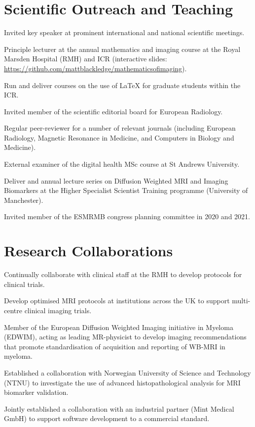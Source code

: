 \documentclass[]{mbcv}
\begin{document}
\section{Scientific Outreach and Teaching}
\vspace*{10pt}
\begin{tightemize}
\item Invited key speaker at prominent international and national scientific meetings.
\item Principle lecturer at the annual mathematics and imaging course at the Royal Marsden Hospital (RMH) and ICR (interactive slides: \href{https://github.com/mattblackledge/mathematicsofimaging}{https://github.com/mattblackledge/mathematicsofimaging}).
\item Run and deliver courses on the use of LaTeX for graduate students within the ICR. 
\item Invited member of the scientific editorial board for European Radiology.
\item Regular peer-reviewer for a number of relevant journals (including European Radiology, Magnetic Resonance in Medicine, and Computers in Biology and Medicine).
\item External examiner of the digital health MSc course at St Andrews University.
\item Deliver and annual lecture series on Diffusion Weighted MRI and Imaging Biomarkers at the Higher Specialist Scientist Training programme (University of Manchester).
\item Invited member of the ESMRMB congress planning committee in 2020 and 2021.
\end{tightemize}
\sectionsep


\section{Research Collaborations}
\vspace*{10pt}
\begin{tightemize}
\item Continually collaborate with clinical staff at the RMH to develop protocols for clinical trials.
\item Develop optimised MRI protocols at institutions across the UK to support multi-centre clinical imaging trials.
\item Member of the European Diffusion Weighted Imaging initiative in Myeloma (EDWIM), acting as leading MR-physicist to develop imaging recommendations that promote standardisation of acquisition and reporting of WB-MRI in myeloma.
\item Established a collaboration with Norwegian University of Science and Technology (NTNU) to investigate the use of advanced histopathological analysis for MRI biomarker validation.
\item Jointly established a collaboration with an industrial partner (Mint Medical GmbH) to support software development to a commercial standard.
\end{tightemize}
\end{document}
